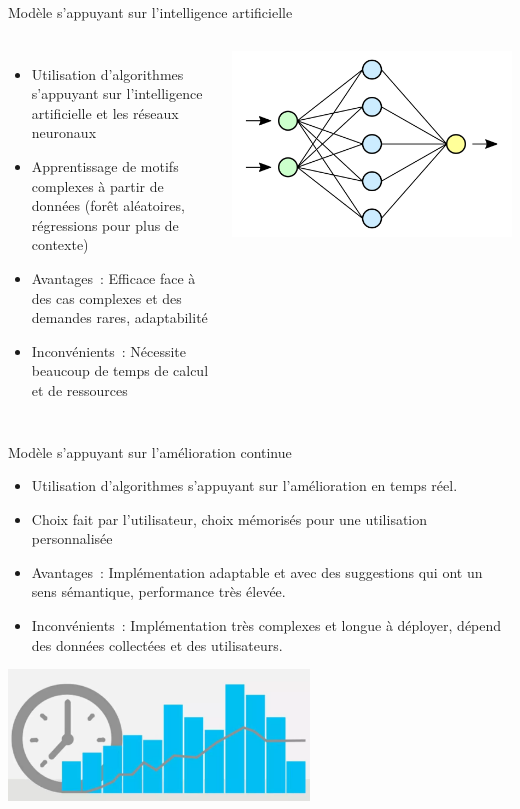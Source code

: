 \begin{frame}{Modèle s'appuyant sur l'intelligence artificielle}
	\begin{columns}
		\begin{itemize}
			\item Utilisation d'algorithmes s'appuyant sur l'intelligence artificielle et les réseaux neuronaux
			\item Apprentissage de motifs complexes à partir de données (forêt aléatoires, régressions pour plus de contexte)
			\item Avantages~: Efficace face à des cas complexes et des demandes rares, adaptabilité
			\item Inconvénients~: Nécessite beaucoup de temps de calcul et de ressources
		\end{itemize}
		\includegraphics[width=\textwidth]{images/intelligence.png}
	\end{columns}
\end{frame}


\begin{frame}{Modèle s'appuyant sur l'amélioration continue}
	\begin{itemize}
		\item Utilisation d'algorithmes s'appuyant sur l'amélioration en temps réel.
		\item Choix fait par l'utilisateur, choix mémorisés pour une utilisation personnalisée
		\item Avantages~: Implémentation adaptable et avec des suggestions qui ont un sens sémantique, performance très élevée.
		\item Inconvénients~: Implémentation très complexes et longue à déployer, dépend des données collectées et des utilisateurs.
	\end{itemize}
	\begin{center}
		\includegraphics[width=0.6\textwidth]{images/learning.png}
	\end{center}
\end{frame}
